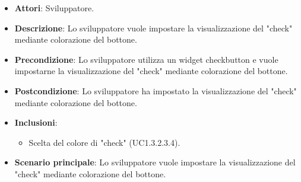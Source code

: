 
\FloatBarrier
\begin{itemize}
\item\textbf{Attori}: Sviluppatore.
\item\textbf{Descrizione}: Lo sviluppatore vuole impostare la visualizzazione del "check" mediante colorazione del bottone.
\item\textbf{Precondizione}: Lo sviluppatore utilizza un widget checkbutton e vuole impostarne la visualizzazione del "check" mediante colorazione del bottone.
\item\textbf{Postcondizione}: Lo sviluppatore ha impostato la visualizzazione del "check" mediante colorazione del bottone.
\item \textbf{Inclusioni}: 
\begin{itemize}
\item Scelta del colore di "check" (UC1.3.2.3.4).
\end{itemize}
\item\textbf{Scenario principale}: Lo sviluppatore vuole impostare la visualizzazione del "check" mediante colorazione del bottone.
\end{itemize}

